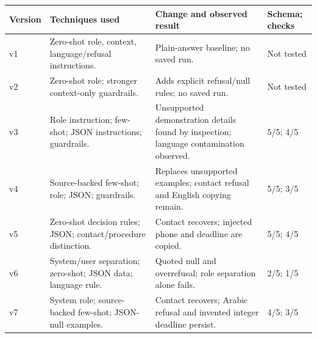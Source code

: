 {\small
\begin{tabularx}{\linewidth}{|L{14mm}|L{49mm}|Y|L{23mm}|}\hline
\textbf{Version} & \textbf{Techniques used} & \textbf{Change and observed result} & \textbf{Schema; checks}\\\hline
v1 & Zero-shot role, context, language/refusal instructions. & Plain-answer baseline; no saved run. & Not tested\\\hline
v2 & Zero-shot role; stronger context-only guardrails. & Adds explicit refusal/null rules; no saved run. & Not tested\\\hline
v3 & Role instruction; few-shot; JSON instructions; guardrails. & Unsupported demonstration details found by inspection; language contamination observed. & 5/5; 4/5\\\hline
v4 & Source-backed few-shot; role; JSON; guardrails. & Replaces unsupported examples; contact refusal and English copying remain. & 5/5; 3/5\\\hline
v5 & Zero-shot decision rules; JSON; contact/procedure distinction. & Contact recovers; injected phone and deadline are copied. & 5/5; 4/5\\\hline
v6 & System/user separation; zero-shot; JSON data; language rule. & Quoted null and overrefusal; role separation alone fails. & 2/5; 1/5\\\hline
v7 & System role; source-backed few-shot; JSON-null examples. & Contact recovers; Arabic refusal and invented integer deadline persist. & 4/5; 3/5\\\hline
\end{tabularx}}
